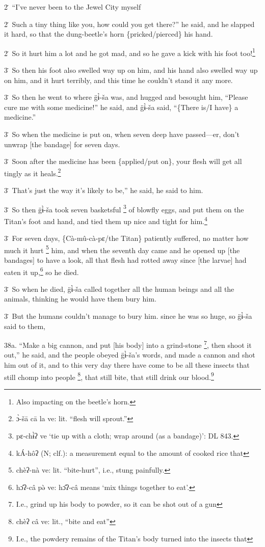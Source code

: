 2\. ``I've never been to the Jewel City myself

2\. Such a tiny thing like you, how could you get there?'' he said, and he slapped
it hard, so that the dung-beetle's horn \{pricked/pierced\} his hand.

2\. So it hurt him a lot and he got mad, and so he gave a kick with his foot too!\footnote{Also impacting on the beetle's horn.}

3\. So then his foot also swelled way up on him, and his hand also swelled way
up on him, and it hurt terribly, and this time he couldn't stand it any more.

3\. So then he went to where g̈ɨ̀-ša was, and hugged and besought him, ``Please
cure me with some medicine!'' he said, and g̈ɨ̀-ša said, ``\{There is/I have\}
a medicine.''

3\. So when the medicine is put on, when seven deep have passed---er, don't unwrap
[the bandage] for seven days.

3\. Soon after the medicine has been \{applied/put on\}, your flesh will get all
tingly as it heals.\footnote{ɔ̀-šā cā la ve: lit. ``flesh will sprout.''}

3\. That's just the way it's likely to be,'' he said, he said to him.

3\. So then g̈ɨ̀-ša took seven basketsful \footnote{pɛ-chɨ̀ʔ ve `tie up with a cloth; wrap around (as a bandage)': DL 843.} of blowfly eggs, and put them
on the Titan's foot and hand, and tied them up nice and tight for him.\footnote{kÁ-hôʔ (N; clf.): a measurement equal to the amount of cooked rice that}

3\. For seven days, \{Cà-mû-cà-pɛ/the Titan\} patiently suffered, no matter
how much it hurt \footnote{chèʔ-nà ve: lit. ``bite-hurt'', i.e., stung painfully.} him, and when the seventh day came and he opened up [the
bandages] to have a look, all that flesh had rotted away since [the larvae] had
eaten it up,\footnote{hɔ̂ʔ-câ pə̀ ve: hɔ̂ʔ-câ means `mix things together to eat'.} so he died.

3\. So when he died, g̈ɨ̀-ša called together all the human beings and all the
animals, thinking he would have them bury him.

3\. But the humans couldn't manage to bury him. since he was so huge, so g̈ɨ̀-ša
said to them,

38a. ``Make a big cannon, and put [his body] into a grind-stone \footnote{I.e., grind up his body to powder, so it can be shot out of a gun}, then shoot
it out,'' he said, and the people obeyed g̈ɨ̀-ša's words, and made a cannon
and shot him out of it, and to this very day there have come to be all these insects
that still chomp into people \footnote{chèʔ câ ve: lit., ``bite and eat''}, that still bite, that still drink our blood.\footnote{I.e., the powdery remains of the Titan's body turned into the insects that}

